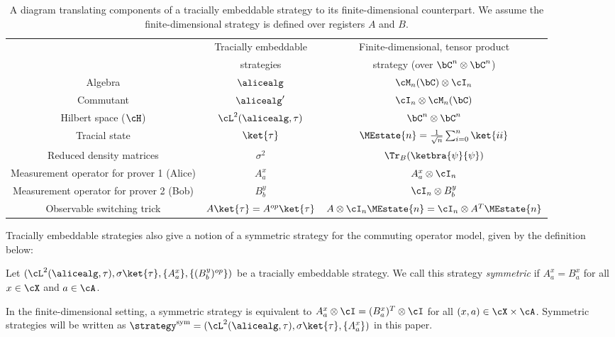 \begin{table}[!htb]
	\centering
	\small
	\vspace{1em}
	\begin{tabular}{|c |c| c|}
	\hline
			 & Tracially embeddable   & Finite-dimensional, tensor product   \\
			 & strategies &    strategy (over $\bC^n \otimes \bC^n$) \\
		\hline
		Algebra &  $\alicealg$  & $\cM_n (\bC) \otimes \cI_n$ \\
		\hline
		Commutant & $\alicealg'$ &  $\cI_n \otimes \cM_n (\bC)$ \\
		\hline
		Hilbert space ($\cH$) & $\cL^2(\alicealg, \tau)$ & $\bC^n \otimes \bC^n$ \\
		\hline
		Tracial state & $\ket{\tau}$ & $\MEstate{n} = \frac{1}{\sqrt{n}}\sum_{i=0}^n \ket{ii}$ \\
		\hline
		Reduced density matrices & $\sigma^2$ & $\Tr_B(\ketbra{\psi}{\psi})$ \\
		\hline
		Measurement operator for prover 1 (Alice) & $A^x_a$ & $A^x_a \otimes \cI_n$ \\
		\hline
		Measurement operator for prover 2 (Bob) & $B^y_b$ & $\cI_n \otimes B^y_b$ \\
		\hline
		Observable switching trick & $A \ket{\tau} = A^{op} \ket{\tau}$ & $A \otimes \cI_n \MEstate{n} = \cI_n \otimes A^T \MEstate{n}$ \\
		\hline
	\end{tabular}
	\caption{A diagram translating components of a tracially embeddable strategy to its finite-dimensional counterpart. We assume the finite-dimensional strategy is defined over registers $A$ and $B$. }
	\label{fig:tracialemdtofd}
\end{table}
Tracially embeddable strategies also give a notion of a symmetric strategy for the commuting operator model, given by the definition below:
\begin{definition} \label{def:symstrategy}
	Let $( \cL^2(\alicealg, \tau), \sigma \ket{\tau},\{ A_{a}^x \},  \{ (B_{b}^y)^{op} \} )$ be a tracially embeddable strategy. We call this strategy \textit{symmetric} if $A_{a}^x = B_{a}^x$ for all $x \in \cX$ and $a \in \cA$. 
\end{definition}
In the finite-dimensional setting, a symmetric strategy is equivalent to $A_{a}^x \otimes \cI = (B_{a}^x)^{T} \otimes \cI$ for all $(x,a) \in \cX \times \cA$. Symmetric strategies will be written as $\strategy^{\text{sym}} = (\cL^2(\alicealg, \tau), \sigma \ket{\tau},\{ A_{a}^x \})$ in this paper.

